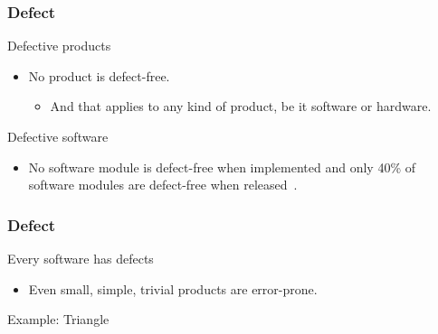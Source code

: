 \begin{frame}[parent={cmap:software-testing-foundations}, hasprev=false, hasnext=true]
\frametitle{Defect}
\label{concept:defect}

\begin{block:fact}{Defective products}
\begin{itemize}
    \item No product is defect-free.
    \begin{itemize}
		\item And that applies to any kind of product, be it software or
		hardware.
    \end{itemize}
\end{itemize}

\hfill
{}
\end{block:fact}


\begin{block:fact}{Defective software}
\begin{itemize}
	\item No software module is defect-free when implemented and only 40\% of
    software modules are defect-free when released~\cite{shull-etal:2002}.
\end{itemize}
\hfill
{}
\end{block:fact}
\end{frame}


\begin{frame}[hasprev=true, hasnext=true]
\frametitle{Defect}
\label{concept:defect-detection}

\begin{block:fact}{Every software has defects}
\begin{itemize}
	\item Even small, simple, trivial products are error-prone.
\end{itemize}
\end{block:fact}

\begin{block}{Example: Triangle}
\centering
{}
\end{block}
\end{frame}


